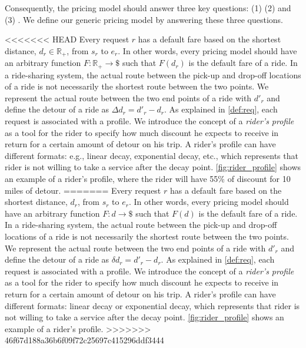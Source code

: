 Consequently, the pricing model should answer three key questions: (1)  (2)  and (3) . We define our generic pricing model by answering these three questions.

<<<<<<< HEAD
Every request $r$ has a default fare based on the shortest distance, $d_r \in \mathbb{R}_{+} $, from $s_r$ to $e_r$. In other words, every pricing model should have an arbitrary function $F: \mathbb{R}_{+}  \rightarrow \$ $ such that $F(d_r)$ is the default fare of a ride. In a ride-sharing system, the actual route between the pick-up and drop-off locations of a ride is not necessarily the shortest route between the two points. We represent the actual route between the two end points of a ride with $d'_r$ and define the detour of a ride as $\Delta d_r = d'_r - d_r$. As explained in \cref{def:req}, each request is associated with a profile. We introduce the concept of a \textit{rider's profile} as a tool for the rider to specify how much discount he expects to receive in return for a certain amount of detour on his trip. A rider's profile can have different formats: e.g., linear decay, exponential decay, etc., which represents that rider is not willing to take a service after the decay point. \cref{fig:rider_profile} shows an example of a rider's profile, where the rider will have 55\% of discount for 10 miles of detour.
=======
Every request $r$ has a default fare based on the shortest distance, $d_r$, from $s_r$ to $e_r$. In other words, every pricing model should have an arbitrary function $F: d \rightarrow \$ $ such that $F(d)$ is the default fare of a ride. In a ride-sharing system, the actual route between the pick-up and drop-off locations of a ride is not necessarily the shortest route between the two points. We represent the actual route between the two end points of a ride with $d'_r$ and define the detour of a ride as $\delta d_r = d'_r - d_r$. As explained in \cref{def:req}, each request is associated with a profile. We introduce the concept of a \textit{rider's profile} as a tool for the rider to specify how much discount he expects to receive in return for a certain amount of detour on his trip. A rider's profile can have different formats: linear decay or exponential decay, which represents that rider is not willing to  take a service after the decay point. \cref{fig:rider_profile} shows an example of a rider's profile.
>>>>>>> 46f67d188a36b6f09f72c25697c415296ddf3444

